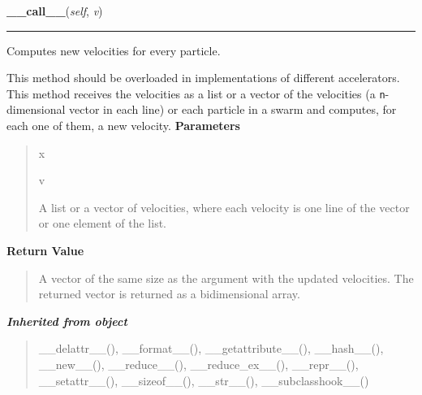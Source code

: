     \vspace{0.5ex}

\hspace{.8\funcindent}\begin{boxedminipage}{\funcwidth}

    \raggedright \textbf{\_\_call\_\_}(\textit{self}, \textit{v})

    \vspace{-1.5ex}

    \rule{\textwidth}{0.5\fboxrule}
\setlength{\parskip}{2ex}

Computes new velocities for every particle.

This method should be overloaded in implementations of different
accelerators. This method receives the velocities as a list or a vector
of the velocities (a \texttt{n}-dimensional vector in each line) or each
particle in a swarm and computes, for each one of them, a new velocity.
\setlength{\parskip}{1ex}
      \textbf{Parameters}
      \vspace{-1ex}

      \begin{quote}
        \begin{Ventry}{x}

          \item[v]


A list or a vector of velocities, where each velocity is one line of
the vector or one element of the list.
        \end{Ventry}

      \end{quote}

      \textbf{Return Value}
    \vspace{-1ex}

      \begin{quote}

A vector of the same size as the argument with the updated velocities.
The returned vector is returned as a bidimensional array.
      \end{quote}

    \end{boxedminipage}


\large{\textbf{\textit{Inherited from object}}}

\begin{quote}
\_\_delattr\_\_(), \_\_format\_\_(), \_\_getattribute\_\_(), \_\_hash\_\_(), \_\_new\_\_(), \_\_reduce\_\_(), \_\_reduce\_ex\_\_(), \_\_repr\_\_(), \_\_setattr\_\_(), \_\_sizeof\_\_(), \_\_str\_\_(), \_\_subclasshook\_\_()
\end{quote}

